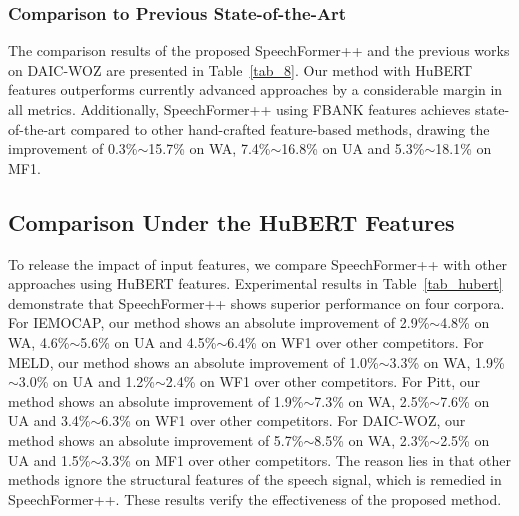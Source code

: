 \documentclass[lettersize,journal]{IEEEtran}
\begin{document}
\subsubsection{Comparison to Previous State-of-the-Art} The comparison results of the proposed SpeechFormer++ and the previous works on DAIC-WOZ are presented in Table~\ref{tab_8}. Our method with HuBERT features outperforms currently advanced approaches by a considerable margin in all metrics. Additionally, SpeechFormer++ using FBANK features achieves state-of-the-art compared to other hand-crafted feature-based methods, drawing the improvement of 0.3\%$\sim$15.7\% on WA, 7.4\%$\sim$16.8\% on UA and 5.3\%$\sim$18.1\% on MF1.

\subsection{Comparison Under the HuBERT Features}
To release the impact of input features, we compare SpeechFormer++ with other approaches using HuBERT features. Experimental results in Table~\ref{tab_hubert} demonstrate that SpeechFormer++ shows superior performance on four corpora. For IEMOCAP, our method shows an absolute improvement of 2.9\%$\sim$4.8\% on WA, 4.6\%$\sim$5.6\% on UA and 4.5\%$\sim$6.4\% on WF1 over other competitors. For MELD, our method shows an absolute improvement of 1.0\%$\sim$3.3\% on WA, 1.9\%$\sim$3.0\% on UA and 1.2\%$\sim$2.4\% on WF1 over other competitors. For Pitt, our method shows an absolute improvement of 1.9\%$\sim$7.3\% on WA, 2.5\%$\sim$7.6\% on UA and 3.4\%$\sim$6.3\% on WF1 over other competitors. For DAIC-WOZ, our method shows an absolute improvement of 5.7\%$\sim$8.5\% on WA, 2.3\%$\sim$2.5\% on UA and 1.5\%$\sim$3.3\% on MF1 over other competitors. The reason lies in that other methods ignore the structural features of the speech signal, which is remedied in SpeechFormer++. These results verify the effectiveness of the proposed method.
\end{document}
